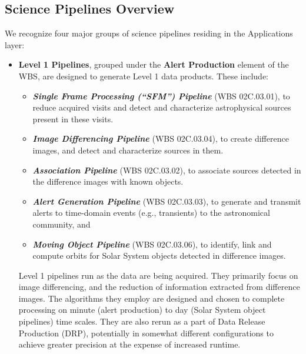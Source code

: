 \documentclass[12pt]{article}
\newcommand{\wbsSFM}{WBS 02C.03.01}
\newcommand{\wbsAssocP}{WBS 02C.03.02}
\newcommand{\wbsAP}{WBS 02C.03.03}
\newcommand{\wbsDiffim}{WBS 02C.03.04}
\newcommand{\wbsMOPS}{WBS 02C.03.06}
\begin{document}
\subsection{Science Pipelines Overview}

We recognize four major groups of science pipelines residing in the Applications layer:
\begin{itemize}
    \item {\bf Level 1 Pipelines}, grouped under the {\bf Alert Production} element of the WBS, are designed to generate Level 1 data products. These include:
    \begin{itemize}
    \item {\bf \emph{Single Frame Processing (``SFM'') Pipeline}} (\wbsSFM), to reduce acquired visits and detect and characterize astrophysical sources present in these visits.
    \item {\bf \emph{Image Differencing Pipeline}} (\wbsDiffim), to create difference images, and detect and characterize sources in them.
    \item {\bf \emph{Association Pipeline}} (\wbsAssocP), to associate sources detected in the difference images with known objects.
    \item {\bf \emph{Alert Generation Pipeline}} (\wbsAP), to generate and transmit alerts to time-domain events (e.g., transients) to the astronomical community, and
    \item {\bf \emph{Moving Object Pipeline}} (\wbsMOPS), to identify, link and compute orbits for Solar System objects detected in difference images.
    \end{itemize}
Level 1 pipelines run as the data are being acquired. They primarily focus on image differencing, and the reduction of information extracted from difference images. The algorithms they employ are designed and chosen to complete processing on minute (alert production) to day (Solar System object pipelines) time scales. They are also rerun as a part of Data Release Production (DRP), potentially in somewhat different configurations to achieve greater precision at the expense of increased runtime.
    

\end{itemize}
\end{document}
